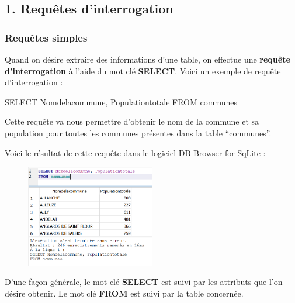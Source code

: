 \documentclass[
  letterpaper,
  DIV=11,
  numbers=noendperiod]{scrartcl}
\newenvironment{Shaded}{\begin{snugshade}}{\end{snugshade}}
\newcommand{\KeywordTok}[1]{\textcolor[rgb]{0.00,0.23,0.31}{#1}}
\newcommand{\NormalTok}[1]{\textcolor[rgb]{0.00,0.23,0.31}{#1}}
\begin{document}
\hypertarget{requuxeates-dinterrogation}{%
\subsection{1. Requêtes
d'interrogation}\label{requuxeates-dinterrogation}}

\hypertarget{requuxeates-simples}{%
\subsubsection{Requêtes simples}\label{requuxeates-simples}}

Quand on désire extraire des informations d'une table, on effectue une
\textbf{requête d'interrogation} à l'aide du mot clé \textbf{SELECT}.
Voici un exemple de requête d'interrogation :

\begin{Shaded}
\begin{Highlighting}[]
\KeywordTok{SELECT}\NormalTok{ Nomdelacommune, Populationtotale}
\KeywordTok{FROM}\NormalTok{ communes}
\end{Highlighting}
\end{Shaded}

Cette requête va nous permettre d'obtenir le nom de la commune et sa
population pour toutes les communes présentes dans la table
``communes''.

Voici le résultat de cette requête dans le logiciel DB Browser for
SqLite :

\begin{figure}

{\centering \includegraphics[width=0.5\textwidth,height=\textheight]{SQL1.png}

}

\end{figure}

D'une façon générale, le mot clé \textbf{SELECT} est suivi par les
attributs que l'on désire obtenir. Le mot clé \textbf{FROM} est suivi
par la table concernée.
\end{document}
